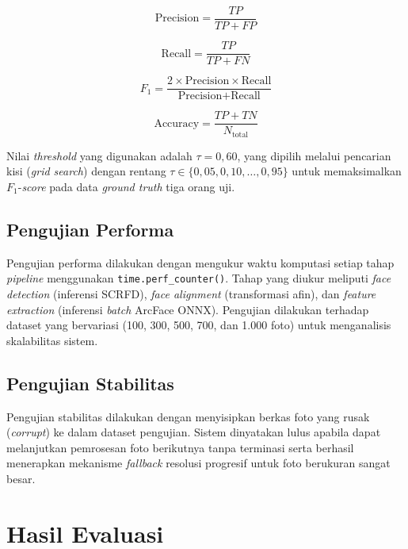 \begin{equation}
\label{eq:precision}
\text{Precision} = \frac{TP}{TP + FP}
\end{equation}

\begin{equation}
\label{eq:recall}
\text{Recall} = \frac{TP}{TP + FN}
\end{equation}

\begin{equation}
\label{eq:f1}
F_1 = \frac{2 \times \text{Precision} \times \text{Recall}}{\text{Precision} + \text{Recall}}
\end{equation}

\begin{equation}
\label{eq:accuracy}
\text{Accuracy} = \frac{TP + TN}{N_{\text{total}}}
\end{equation}

Nilai \textit{threshold} yang digunakan adalah $\tau = 0{,}60$, yang dipilih melalui pencarian kisi (\textit{grid search}) dengan rentang $\tau \in \{0{,}05, 0{,}10, \ldots, 0{,}95\}$ untuk memaksimalkan $F_1$-\textit{score} pada data \textit{ground truth} tiga orang uji.

\subsection{Pengujian Performa}

Pengujian performa dilakukan dengan mengukur waktu komputasi setiap tahap \textit{pipeline} menggunakan \texttt{time.perf\_counter()}. Tahap yang diukur meliputi \textit{face detection} (inferensi SCRFD), \textit{face alignment} (transformasi afin), dan \textit{feature extraction} (inferensi \textit{batch} ArcFace ONNX). Pengujian dilakukan terhadap dataset yang bervariasi (100, 300, 500, 700, dan 1.000 foto) untuk menganalisis skalabilitas sistem.

\subsection{Pengujian Stabilitas}

Pengujian stabilitas dilakukan dengan menyisipkan berkas foto yang rusak (\textit{corrupt}) ke dalam dataset pengujian. Sistem dinyatakan lulus apabila dapat melanjutkan pemrosesan foto berikutnya tanpa terminasi serta berhasil menerapkan mekanisme \textit{fallback} resolusi progresif untuk foto berukuran sangat besar.

\section{Hasil Evaluasi}

